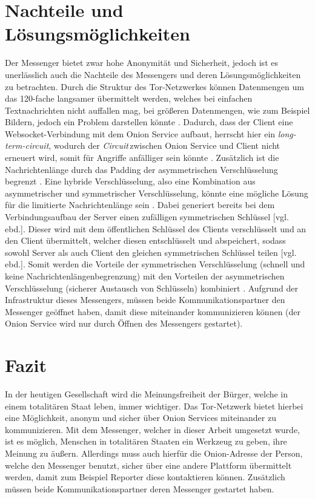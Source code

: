 \documentclass[a4paper,ngerman, headheight=28pt,12pt]{scrartcl}
\newcommand{\vcite}[1]{\cite[vgl.][]{#1}}
\newcommand{\vebd}{[vgl. ebd.]}
\newcommand{\circuit}{\textit{Circuit\,}}
\begin{document}
\section{Nachteile und Lösungsmöglichkeiten}
Der Messenger bietet zwar hohe Anonymität und Sicherheit, jedoch ist es unerlässlich auch die Nachteile des Messengers und deren Lösungsmöglichkeiten zu betrachten. Durch die Struktur des Tor-Netzwerkes können Datenmengen um das 120-fache langsamer übermittelt werden, welches bei einfachen Textnachrichten nicht auffallen mag, bei größeren Datenmengen, wie zum Beispiel Bildern, jedoch ein Problem darstellen könnte \vcite{TorPerformance}. Dadurch, dass der Client eine Websocket-Verbindung mit dem Onion Service aufbaut, herrscht hier ein \textit{long-term-circuit}, wodurch der \circuit zwischen Onion Service und Client nicht erneuert wird, somit für Angriffe anfälliger sein könnte \vcite{FAQCircuitLifetime}. Zusätzlich ist die Nachrichtenlänge durch das Padding der asymmetrischen Verschlüsselung begrenzt \vcite{OpensslRsaMaxLength}. %
Eine hybride Verschlüsselung, also eine Kombination aus asymmetrischer und symmetrischer Verschlüsselung, könnte eine mögliche Lösung für die limitierte Nachrichtenlänge sein \vcite{HybridEncryption}. Dabei generiert bereits bei dem Verbindungsaufbau der Server einen zufälligen symmetrischen Schlüssel \vebd. Dieser wird mit dem öffentlichen Schlüssel des Clients verschlüsselt und an den Client übermittelt, welcher diesen entschlüsselt und abspeichert, sodass sowohl Server als auch Client den gleichen symmetrischen Schlüssel teilen \vebd.
Somit werden die Vorteile der symmetrischen Verschlüsselung (schnell und keine Nachrichtenlängenbegrenzung) mit den Vorteilen der asymmetrischen Verschlüsselung (sicherer Austausch von Schlüsseln) kombiniert \vcite{HybridTechnopedia}. Aufgrund der Infrastruktur dieses Messengers, müssen beide Kommunikationspartner den Messenger geöffnet haben, damit diese miteinander kommunizieren können (der Onion Service wird nur durch Öffnen des Messengers gestartet).

\section{Fazit}
In der heutigen Gesellschaft wird die Meinungsfreiheit der Bürger, welche in einem totalitären Staat leben, immer wichtiger. Das Tor-Netzwerk bietet hierbei eine Möglichkeit, anonym und sicher über Onion Services miteinander zu kommunizieren. Mit dem Messenger, welcher in dieser Arbeit umgesetzt wurde, ist es möglich, Menschen in totalitären Staaten ein Werkzeug zu geben, ihre Meinung zu äußern. Allerdings muss auch hierfür die Onion-Adresse der Person, welche den Messenger benutzt, sicher über eine andere Plattform übermittelt werden, damit zum Beispiel Reporter diese kontaktieren können. Zusätzlich müssen beide Kommunikationspartner deren Messenger gestartet haben.
\end{document}
